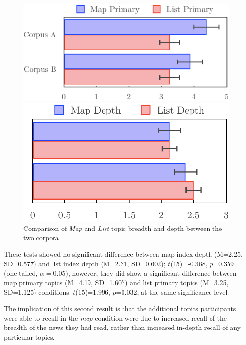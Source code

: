 \begin{figure}[h]
\centering
\begin{minipage}{.5\textwidth}
  \centering
  \includegraphics[height=.47\linewidth]{img/evaluation/primary.pdf}
  \end{minipage}%
\begin{minipage}{.5\textwidth}
  \centering
  \includegraphics[height=.47\linewidth]{img/evaluation/depth.pdf}
\end{minipage}
	\caption{Comparison of \textit{Map} and \textit{List} topic breadth and depth between the two corpora}
  \label{fig:depthbreadth}
\end{figure}

These tests showed no significant difference between map index depth (M=2.25, SD=0.577) and list index depth (M=2.31, SD=0.602); $t$(15)=-0.368, $p$=0.359 (one-tailed, $\alpha=0.05$), however, they did show a significant difference between map primary topics (M=4.19, SD=1.607) and list primary topics (M=3.25, SD=1.125) conditions; $t$(15)=1.996, $p$=0.032, at the same significance level.

The implication of this second result is that the additional topics participants were able to recall in the \textit{map} condition were due to increased recall of the breadth of the news they had read, rather than increased in-depth recall of any particular topics.

